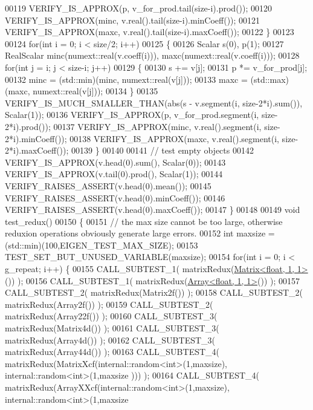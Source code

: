 \begin{DoxyCode}
00119     VERIFY\_IS\_APPROX(p, v\_for\_prod.tail(size-i).prod());
00120     VERIFY\_IS\_APPROX(minc, v.real().tail(size-i).minCoeff());
00121     VERIFY\_IS\_APPROX(maxc, v.real().tail(size-i).maxCoeff());
00122   \}
00123 
00124   \textcolor{keywordflow}{for}(\textcolor{keywordtype}{int} i = 0; i < size/2; i++)
00125   \{
00126     Scalar s(0), p(1);
00127     RealScalar minc(numext::real(v.coeff(i))), maxc(numext::real(v.coeff(i)));
00128     \textcolor{keywordflow}{for}(\textcolor{keywordtype}{int} j = i; j < size-i; j++)
00129     \{
00130       s += v[j];
00131       p *= v\_for\_prod[j];
00132       minc = (std::min)(minc, numext::real(v[j]));
00133       maxc = (std::max)(maxc, numext::real(v[j]));
00134     \}
00135     VERIFY\_IS\_MUCH\_SMALLER\_THAN(abs(s - v.segment(i, size-2*i).sum()), Scalar(1));
00136     VERIFY\_IS\_APPROX(p, v\_for\_prod.segment(i, size-2*i).prod());
00137     VERIFY\_IS\_APPROX(minc, v.real().segment(i, size-2*i).minCoeff());
00138     VERIFY\_IS\_APPROX(maxc, v.real().segment(i, size-2*i).maxCoeff());
00139   \}
00140   
00141   \textcolor{comment}{// test empty objects}
00142   VERIFY\_IS\_APPROX(v.head(0).sum(),   Scalar(0));
00143   VERIFY\_IS\_APPROX(v.tail(0).prod(),  Scalar(1));
00144   VERIFY\_RAISES\_ASSERT(v.head(0).mean());
00145   VERIFY\_RAISES\_ASSERT(v.head(0).minCoeff());
00146   VERIFY\_RAISES\_ASSERT(v.head(0).maxCoeff());
00147 \}
00148 
00149 \textcolor{keywordtype}{void} test\_redux()
00150 \{
00151   \textcolor{comment}{// the max size cannot be too large, otherwise reduxion operations obviously generate large errors.}
00152   \textcolor{keywordtype}{int} maxsize = (std::min)(100,EIGEN\_TEST\_MAX\_SIZE);
00153   TEST\_SET\_BUT\_UNUSED\_VARIABLE(maxsize);
00154   \textcolor{keywordflow}{for}(\textcolor{keywordtype}{int} i = 0; i < g\_repeat; i++) \{
00155     CALL\_SUBTEST\_1( matrixRedux(\hyperlink{group___core___module_class_eigen_1_1_matrix}{Matrix<float, 1, 1>}()) );
00156     CALL\_SUBTEST\_1( matrixRedux(\hyperlink{group___core___module_class_eigen_1_1_array}{Array<float, 1, 1>}()) );
00157     CALL\_SUBTEST\_2( matrixRedux(Matrix2f()) );
00158     CALL\_SUBTEST\_2( matrixRedux(Array2f()) );
00159     CALL\_SUBTEST\_2( matrixRedux(Array22f()) );
00160     CALL\_SUBTEST\_3( matrixRedux(Matrix4d()) );
00161     CALL\_SUBTEST\_3( matrixRedux(Array4d()) );
00162     CALL\_SUBTEST\_3( matrixRedux(Array44d()) );
00163     CALL\_SUBTEST\_4( matrixRedux(MatrixXcf(internal::random<int>(1,maxsize), internal::random<int>(1,maxsize
      ))) );
00164     CALL\_SUBTEST\_4( matrixRedux(ArrayXXcf(internal::random<int>(1,maxsize), internal::random<int>(1,maxsize

\end{DoxyCode}
